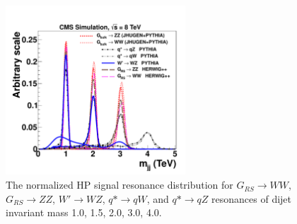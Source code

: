 \begin{figure}[htb]
\begin{center}
\includegraphics[width=0.6\textwidth]{EXO-12-024/figs/signal-acc-eff/resonance-shape.pdf}
\end{center}
\caption{The normalized HP signal resonance distribution for  $G_{RS}\to WW$, $G_{RS}\to ZZ$, $W' \to WZ$, $q*\to qW$, and $q*\to qZ$ resonances of dijet invariant mass 1.0\TeVcc, 1.5\TeVcc, 2.0\TeVcc,  3.0\TeVcc, 4.0\TeVcc.
}
\label{fig:highsignalShapes}
\end{figure}



\clearpage

